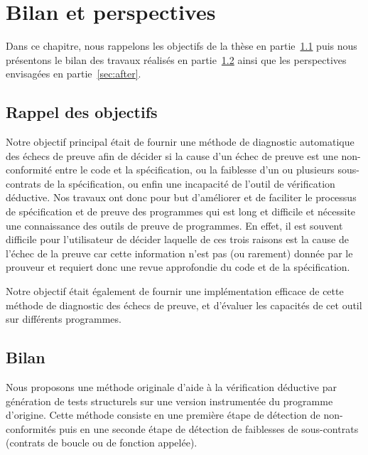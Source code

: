
\chapter{Bilan et perspectives}
\label{sec:end}


Dans ce chapitre, nous rappelons les objectifs de la thèse en
partie~\ref{sec:obj} puis nous présentons le bilan des travaux réalisés en
partie~\ref{sec:bilan} ainsi que les perspectives envisagées en
partie~\ref{sec:after}.


\section{Rappel des objectifs}
\label{sec:obj}


Notre objectif principal était de fournir une méthode de diagnostic automatique
des échecs de preuve afin de décider si la cause d'un échec de preuve est une
non-conformité entre le code et la spécification, ou la faiblesse d'un ou
plusieurs sous-contrats de la spécification, ou enfin une incapacité de l'outil
de vérification déductive.
Nos travaux ont donc pour but d'améliorer et de faciliter le processus de
spécification et de preuve des programmes qui est long et difficile et nécessite
une connaissance des outils de preuve de programmes.
En effet, il est souvent difficile pour l'utilisateur de décider laquelle de ces
trois raisons est la cause de l'échec de la preuve car cette information n'est
pas (ou rarement) donnée par le prouveur et requiert donc une revue approfondie
du code et de la spécification.

Notre objectif était également de fournir une implémentation efficace de cette
méthode de diagnostic des échecs de preuve, et d'évaluer les capacités de cet
outil sur différents programmes.


\section{Bilan}
\label{sec:bilan}


Nous proposons une méthode originale d'aide à la vérification déductive par
génération de tests structurels sur une version instrumentée du programme
d'origine.
Cette méthode consiste en une première étape de détection de non-conformités
puis en une seconde étape de détection de faiblesses de sous-contrats (contrats
de boucle ou de fonction appelée).

